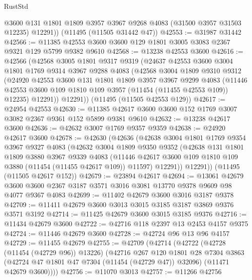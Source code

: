 \begin{lexlean}{RustStd}
\begin{coremodule}
        @3600
        @131
        @1801
        @1809
        @3957
        @3967
        @9268
        @4083
        (@31500 @3957 @31503 @12235)
        @12291))
    (@11495 (@11505 @31442 @47))
@42553 := @31987 @31442
@42566 := @11385 @42553 @3600 @3600 @129 @1801 @3005 @3083 @2367 @9321 @129 @5799 @9382 @9610
@42568 := @13238 @42553 @3600
@42616 := @42566
    (@42568
      @3005
      @1801
      @9317
      @9319
      (@24637
        @42553
        @3600
        @3004
        @1801
        @1769
        @9314
        @3967
        @9288
        @4083
        (@42568
          @3004
          @1809
          @9310
          @9312
          (@24920
            @42553
            @3600
            @131
            @1801
            @1809
            @3957
            @3967
            @9299
            @4083
            (@11446 @42553 @3600 @109 @1810 @109 @3957 (@11454 (@11455 @42553 @109)) @12235)
            @12291))
        @12291))
    (@11495 (@11505 @42553 @129))
@42617 := @24954 @42553
@42630 := @11385 @42617 @3600 @3600 @152 @1769 @3007 @3082 @2367 @9361 @152 @5899 @9381 @9610
@42632 := @13238 @42617 @3600
@42636 := @42632 @3007 @1769 @9357 @9359
@42638 := @24920 @42617 @3600
@42678 := @42630
    (@42636
      (@42638
        @3004
        @1801
        @1769
        @9354
        @3967
        @9327
        @4083
        (@42632
          @3004
          @1809
          @9350
          @9352
          (@42638
            @131
            @1801
            @1809
            @3880
            @3967
            @9339
            @4083
            (@11446 @42617 @3600 @109 @1810 @109 @3880 (@11454 (@11455 @42617 @109)) @11597)
            @12291))
        @12291))
    (@11495 (@11505 @42617 @152))
@42679 := @23894 @42617
@42694 := @13061
    @42679
    @3600
    @3600
    @2367
    @3187
    @3571
    @3016
    @3081
    @13770
    @9378
    @9609
    @98
    @4077
    @9367
    @4083
@42699 := @11402 @42679 @3600 @3016 @3187 @9378
@42709 := @11411 @42679 @3600 @3013 @3015 @3185 @3187 @3869 @9376 @3571 @3192
@42714 := @11425 @42679 @3600 @3015 @3185 @9376
@42716 := @11434 @42679 @3600
@42722 := @42716 @118 @2397 @13 @2453 @4157 @9375
@42724 := @11446 @42679 @3600
@42728 := @42724 @96 @13 @96 @4157
@42729 := @11455 @42679
@42755 := @42709
    (@42714
      (@42722
        (@42728 (@11454 (@42729 @96)) @13226)
        (@42716
          @267
          @120
          @1801
          @28
          @7304
          @3863
          (@42724 @47 @1801 @47 @7304 (@11454 (@42729 @47)) @32096)
          (@11471 @42679 @3600))))
@42756 := @11070 @3013
@42757 := @11266 @42756

\end{coremodule}
\end{lexlean}

